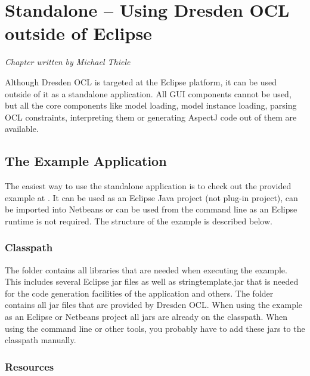 \chapter{Standalone -- Using Dresden OCL outside of Eclipse}
\label{chapter:standalone}
\lstset{language=Java}

\begin{flushright}
\textit{Chapter written by Michael Thiele}
\end{flushright}

Although Dresden OCL is targeted at the Eclipse platform, it can be used outside
of it as a standalone application. All GUI components cannot be used, but all 
the core components like model loading, model instance loading, parsing OCL 
constraints, interpreting them or generating AspectJ code out of them are 
available.


\section{The Example Application}

The easiest way to use the standalone application is to check out the provided 
example at 
.
It can be used as an Eclipse Java project (not plug-in project), can be imported
into Netbeans or can be used from the command line as an Eclipse runtime is not 
required. The structure of the example is described below.


\subsection{Classpath}

The  folder contains all libraries that are needed when executing
the example. This includes several Eclipse jar files as well as
stringtemplate.jar that is needed for the code generation facilities of the 
application and others. The  folder contains all jar files
that are provided by Dresden OCL. When using the example as an Eclipse or
Netbeans project all jars are already on the classpath. When using the command
line or other tools, you probably have to add these jars to the classpath manually.


\subsection{Resources}


